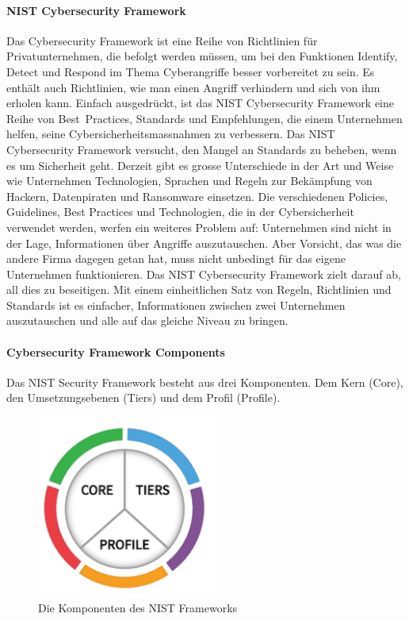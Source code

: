 \documentclass[10pt,a4paper]{article}
\begin{document}
\paragraph*{NIST Cybersecurity Framework}\label{para:NIST}Das Cybersecurity Framework ist eine Reihe von Richtlinien für Privatunternehmen, die befolgt werden müssen, um bei den Funktionen Identify, Detect und Respond im Thema Cyberangriffe besser vorbereitet zu sein. Es enthält auch Richtlinien, wie man einen Angriff verhindern und sich von ihm erholen kann.
Einfach ausgedrückt, ist das NIST Cybersecurity Framework eine Reihe von Best~Practices, Standards und Empfehlungen, die einem Unternehmen helfen, seine Cybersicherheitsmassnahmen zu verbessern. Das NIST Cybersecurity Framework versucht, den Mangel an Standards zu beheben, wenn es um Sicherheit geht. Derzeit gibt es grosse Unterschiede in der Art und Weise wie Unternehmen Technologien, Sprachen und Regeln zur Bekämpfung von Hackern, Datenpiraten und Ransomware einsetzen. Die verschiedenen Policies, Guidelines, Best Practices und Technologien, die in der Cybersicherheit verwendet werden, werfen ein weiteres Problem auf: Unternehmen sind nicht in der Lage, Informationen über Angriffe auszutauschen. Aber Vorsicht, das was die andere Firma dagegen getan hat, muss nicht unbedingt für das eigene Unternehmen funktionieren.
Das NIST Cybersecurity Framework zielt darauf ab, all dies zu beseitigen. Mit einem einheitlichen Satz von Regeln, Richtlinien und Standards ist es einfacher, Informationen zwischen zwei Unternehmen auszutauschen und alle auf das gleiche Niveau zu bringen\cite{guardian}.

\paragraph*{Cybersecurity Framework Components}\label{para:NISTcomponents}Das NIST Security Framework besteht aus drei Komponenten. Dem Kern (Core), den Umsetzungsebenen (Tiers) und dem Profil (Profile).
\begin{figure}[H]
    \begin{center}
    \includegraphics[width=6cm]{images/NISTcomponents.png}
    \caption{Die Komponenten des NIST Frameworks}
    \label{nistcomponents}
    \end{center}
\end{figure}
\end{document}
